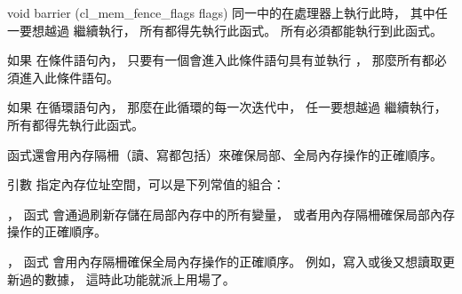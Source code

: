 void barrier (cl_mem_fence_flags flags) 
\stopbuffer
{}
同一中的在處理器上執行此時，
其中任一要想越過  繼續執行，
所有都得先執行此函式。
所有必須都能執行到此函式。

如果  在條件語句內，
只要有一個會進入此條件語句具有並執行 ，
那麼所有都必須進入此條件語句。

如果  在循環語句內，
那麼在此循環的每一次迭代中，
任一要想越過  繼續執行，
所有都得先執行此函式。

 函式還會用內存隔柵（讀、寫都包括）來確保局部、全局內存操作的正確順序。

引數  指定內存位址空間，可以是下列常值的組合：
\startigBase
\item {}，
函式  會通過刷新存儲在局部內存中的所有變量，
或者用內存隔柵確保局部內存操作的正確順序。

\item {}，
函式  會用內存隔柵確保全局內存操作的正確順序。
例如，寫入或後又想讀取更新過的數據，
這時此功能就派上用場了。
\stopigBase
\stopbuffer

\startCLFD


\stopCLFD

